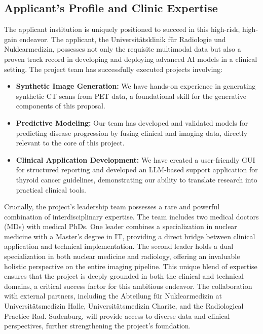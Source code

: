 \documentclass[11pt, a4paper]{article}
\begin{document}
\subsection{Applicant's Profile and Clinic Expertise}
The applicant institution is uniquely positioned to succeed in this high-risk, high-gain endeavor. The applicant, the Universitätsklinik für Radiologie und Nuklearmedizin, possesses not only the requisite multimodal data but also a proven track record in developing and deploying advanced AI models in a clinical setting. The project team has successfully executed projects involving:
\begin{itemize}
    \item \textbf{Synthetic Image Generation:} We have hands-on experience in generating synthetic CT scans from PET data, a foundational skill for the generative components of this proposal.
    \item \textbf{Predictive Modeling:} Our team has developed and validated models for predicting disease progression by fusing clinical and imaging data, directly relevant to the core of this project.
    \item \textbf{Clinical Application Development:} We have created a user-friendly GUI for structured reporting and developed an LLM-based support application for thyroid cancer guidelines, demonstrating our ability to translate research into practical clinical tools.
\end{itemize}
Crucially, the project's leadership team possesses a rare and powerful combination of interdisciplinary expertise. The team includes two medical doctors (MDs) with medical PhDs. One leader combines a specialization in nuclear medicine with a Master's degree in IT, providing a direct bridge between clinical application and technical implementation. The second leader holds a dual specialization in both nuclear medicine and radiology, offering an invaluable holistic perspective on the entire imaging pipeline. This unique blend of expertise ensures that the project is deeply grounded in both the clinical and technical domains, a critical success factor for this ambitious endeavor. The collaboration with external partners, including the Abteilung für Nuklearmedizin at Universitätsmedizin Halle, Universitätsmedizin Charite, and the Radiological Practice Rad. Sudenburg, will provide access to diverse data and clinical perspectives, further strengthening the project's foundation.
\end{document}
